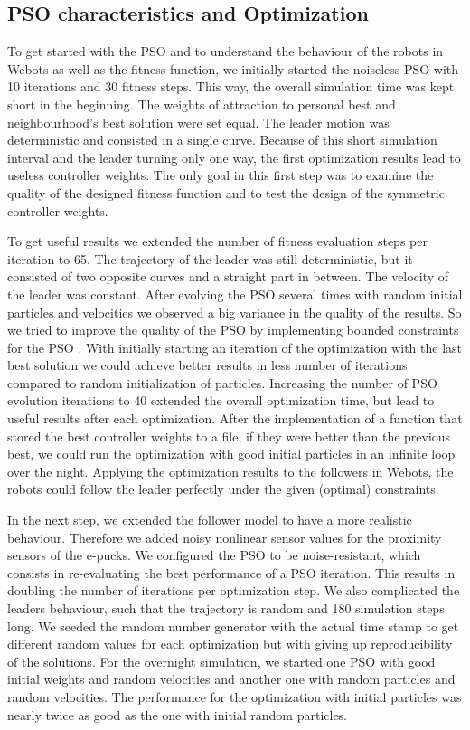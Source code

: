 \documentclass[a4paper, 10pt, conference]{ieeeconf}      %
\begin{document}
\subsection{PSO characteristics and Optimization}

To get started with the PSO and to understand the behaviour of the robots in Webots as well as the fitness function, we initially started the noiseless PSO with 10 iterations and 30 fitness steps. This way, the overall simulation time was kept short in the beginning. The weights of attraction to personal best and neighbourhood's best solution were set equal. The leader motion was deterministic and consisted in a single curve.  Because of this short simulation interval and the leader turning only one way, the first optimization results lead to useless controller weights. The only goal in this first step was to examine the quality of the designed fitness function and to test the design of the symmetric controller weights.

To get useful results we extended the number of fitness evaluation steps per iteration to 65. The trajectory of the leader was still deterministic, but it consisted of two opposite curves and a straight part in between. The velocity of the leader was constant. After evolving the PSO several times with random initial particles and velocities we observed a big variance in the quality of the results. So we tried to improve the quality of the PSO by implementing bounded constraints for the PSO \cite{c1}. With initially starting an iteration of the optimization with the last best solution we could achieve better results in less number of iterations compared to random initialization of particles. Increasing the number of PSO evolution iterations to 40 extended the overall optimization time, but lead to useful results after each optimization. After the implementation of a function that stored the best controller weights to a file, if they were better than the previous best, we could run the optimization with good initial particles in an infinite loop over the night. Applying the optimization results to the followers in Webots, the robots could follow the leader perfectly under the given (optimal) constraints.

In the next step, we extended the follower model to have a more realistic behaviour. Therefore we added noisy nonlinear sensor values for the proximity sensors of the e-pucks. We configured the PSO to be noise-resistant, which consists in re-evaluating the best performance of a PSO iteration. This results in doubling the number of iterations per optimization step. We also complicated the leaders behaviour, such that the trajectory is random and 180 simulation steps long. We seeded the random number generator with the actual time stamp to get different random values for each optimization but with giving up reproducibility of the solutions. For the overnight simulation, we started one PSO with good initial weights and random velocities and another one with random particles and random velocities. The performance for the optimization with initial particles was nearly twice as good as the one with initial random particles.
\end{document}
